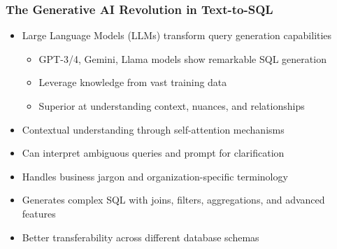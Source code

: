 \begin{frame}\frametitle{The Generative AI Revolution in Text-to-SQL}
      \begin{itemize}
        \item Large Language Models (LLMs) transform query generation capabilities
          \begin{itemize}
            \item GPT-3/4, Gemini, Llama models show remarkable SQL generation
            \item Leverage knowledge from vast training data
            \item Superior at understanding context, nuances, and relationships
          \end{itemize}
        \item Contextual understanding through self-attention mechanisms
        \item Can interpret ambiguous queries and prompt for clarification
        \item Handles business jargon and organization-specific terminology
        \item Generates complex SQL with joins, filters, aggregations, and advanced features
        \item Better transferability across different database schemas
      \end{itemize}
\end{frame}

